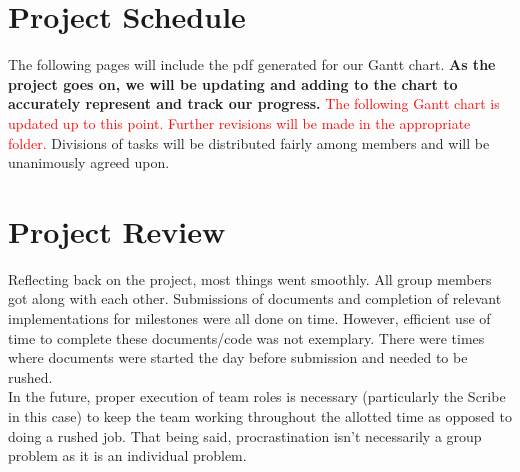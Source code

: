 \documentclass[12pt, titlepage]{article}
\begin{document}
\section{Project Schedule}
The following pages will include the pdf generated for our Gantt chart. \textbf{As the project goes on, we will be updating and adding to the chart to accurately represent and track our progress.} \textcolor{red}{The following Gantt chart is updated up to this point. Further revisions will be made in the appropriate folder.} Divisions of tasks will be distributed fairly among members and will be unanimously agreed upon.


\section {Project Review}
Reflecting back on the project, most things went smoothly. All group members got along with each other. Submissions of documents and completion of relevant implementations for milestones were all done on time. However, efficient use of time to complete these documents/code was not exemplary. There were times where documents were started the day before submission and needed to be rushed.\\
In the future, proper execution of team roles is necessary (particularly the Scribe in this case) to keep the team working throughout the allotted time as opposed to doing a rushed job. That being said, procrastination isn't necessarily a group problem as it is an individual problem. 
\end{document}
